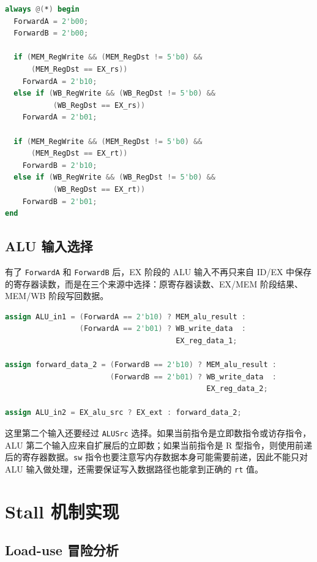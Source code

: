 \documentclass[UTF8,zihao=-4]{ctexart}
\begin{document}
\begin{lstlisting}[language=Verilog]
always @(*) begin
  ForwardA = 2'b00;
  ForwardB = 2'b00;

  if (MEM_RegWrite && (MEM_RegDst != 5'b0) &&
      (MEM_RegDst == EX_rs))
    ForwardA = 2'b10;
  else if (WB_RegWrite && (WB_RegDst != 5'b0) &&
           (WB_RegDst == EX_rs))
    ForwardA = 2'b01;

  if (MEM_RegWrite && (MEM_RegDst != 5'b0) &&
      (MEM_RegDst == EX_rt))
    ForwardB = 2'b10;
  else if (WB_RegWrite && (WB_RegDst != 5'b0) &&
           (WB_RegDst == EX_rt))
    ForwardB = 2'b01;
end
\end{lstlisting}

\subsection{ALU 输入选择}

有了 \texttt{ForwardA} 和 \texttt{ForwardB} 后，EX 阶段的 ALU 输入不再只来自 ID/EX 中保存的寄存器读数，而是在三个来源中选择：原寄存器读数、EX/MEM 阶段结果、MEM/WB 阶段写回数据。

\begin{lstlisting}[language=Verilog]
assign ALU_in1 = (ForwardA == 2'b10) ? MEM_alu_result :
                 (ForwardA == 2'b01) ? WB_write_data  :
                                       EX_reg_data_1;

assign forward_data_2 = (ForwardB == 2'b10) ? MEM_alu_result :
                        (ForwardB == 2'b01) ? WB_write_data  :
                                              EX_reg_data_2;

assign ALU_in2 = EX_alu_src ? EX_ext : forward_data_2;
\end{lstlisting}

这里第二个输入还要经过 \texttt{ALUSrc} 选择。如果当前指令是立即数指令或访存指令，ALU 第二个输入应来自扩展后的立即数；如果当前指令是 R 型指令，则使用前递后的寄存器数据。\texttt{sw} 指令也要注意写内存数据本身可能需要前递，因此不能只对 ALU 输入做处理，还需要保证写入数据路径也能拿到正确的 \texttt{rt} 值。

\section{Stall 机制实现}

\subsection{Load-use 冒险分析}
\end{document}
